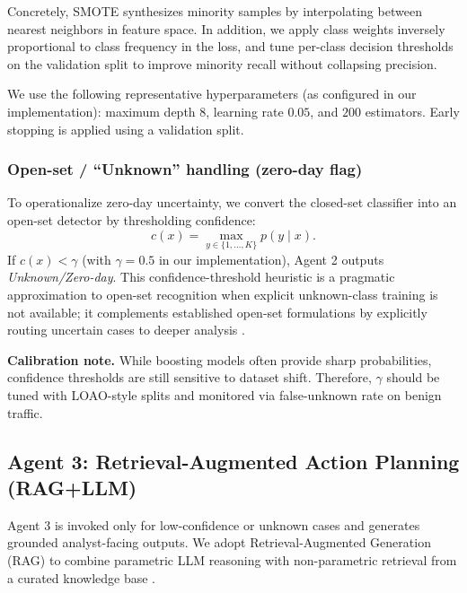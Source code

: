 Concretely, SMOTE synthesizes minority samples by interpolating between nearest neighbors in feature space. In addition, we apply class weights inversely proportional to class frequency in the loss, and tune per-class decision thresholds on the validation split to improve minority recall without collapsing precision.

We use the following representative hyperparameters (as configured in our implementation): maximum depth $8$, learning rate $0.05$, and $200$ estimators. Early stopping is applied using a validation split.

\subsubsection{Open-set / ``Unknown'' handling (zero-day flag)}
To operationalize zero-day uncertainty, we convert the closed-set classifier into an open-set detector by thresholding confidence:
\begin{equation}
 c(x) = \max_{y\in\{1,\dots,K\}} p(y\mid x).
\end{equation}
If $c(x) < \gamma$ (with $\gamma=0.5$ in our implementation), Agent 2 outputs \emph{Unknown/Zero-day}. This confidence-threshold heuristic is a pragmatic approximation to open-set recognition when explicit unknown-class training is not available; it complements established open-set formulations by explicitly routing uncertain cases to deeper analysis \cite{Scheirer2013OpenSet,Bendale2016OpenMax}.

\textbf{Calibration note.} While boosting models often provide sharp probabilities, confidence thresholds are still sensitive to dataset shift. Therefore, $\gamma$ should be tuned with LOAO-style splits and monitored via false-unknown rate on benign traffic.

\subsection{Agent 3: Retrieval-Augmented Action Planning (RAG+LLM)}
\label{sec:agent3_method}

Agent 3 is invoked only for low-confidence or unknown cases and generates grounded analyst-facing outputs. We adopt Retrieval-Augmented Generation (RAG) to combine parametric LLM reasoning with non-parametric retrieval from a curated knowledge base \cite{Lewis2020RAG}.

